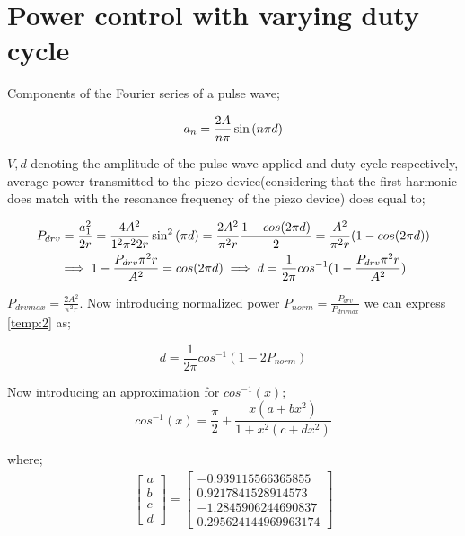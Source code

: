 \documentclass{article}
\begin{document}
\section{Power control with varying duty cycle}
Components of the Fourier series of a pulse wave;

\begin{equation}{\label{eq:fourierseries}}
    a_n = \frac{2A}{n\pi} \sin{(n \pi d)}
\end{equation}

$V, d$ denoting the amplitude of the pulse wave applied and duty cycle respectively, average power transmitted to the piezo device(considering that the first harmonic does match with the resonance frequency of the piezo device) does equal to;

\begin{multline}{\label{temp:2}}
    P_{drv} = \frac{a_1^2}{2r} = \frac{4A^2}{1^2 \pi^2 2 r} \sin^2{(\pi d)} = \frac{2A^2}{\pi^2 r} \frac{1 - cos(2 \pi d)}{2} = \frac{A^2}{\pi^2 r} (1 - cos(2 \pi d)) \\
    \implies 1 - \frac{P_{drv} \pi^2 r}{A^2} = cos(2 \pi d) \implies d = \frac{1}{2\pi} cos^{-1}(1 - \frac{P_{drv} \pi^2 r}{A^2})
\end{multline}

$P_{drvmax} = \frac{2A^2}{\pi^2 r}$. Now introducing normalized power $P_{norm} = \frac{P_{drv}}{P_{drvmax}}$ we can express \eqref{temp:2} as;

\begin{equation}
    d = \frac{1}{2\pi} cos^{-1}(1 - 2P_{norm})
\end{equation}

Now introducing an approximation for $cos^{-1}(x)$;
\begin{equation}
    cos^{-1}(x) = \frac{\pi}{2} + \frac{x(a + bx^2)}{1 + x^2(c + dx^2)}
\end{equation}

where;
\begin{multline}
    \begin{bmatrix}
        a \\
        b \\
        c \\
        d
    \end{bmatrix}
    =
    \begin{bmatrix}
        -0.939115566365855  \\
        0.9217841528914573  \\
        -1.2845906244690837 \\
        0.295624144969963174
    \end{bmatrix}
    \\
\end{multline}
\end{document}
